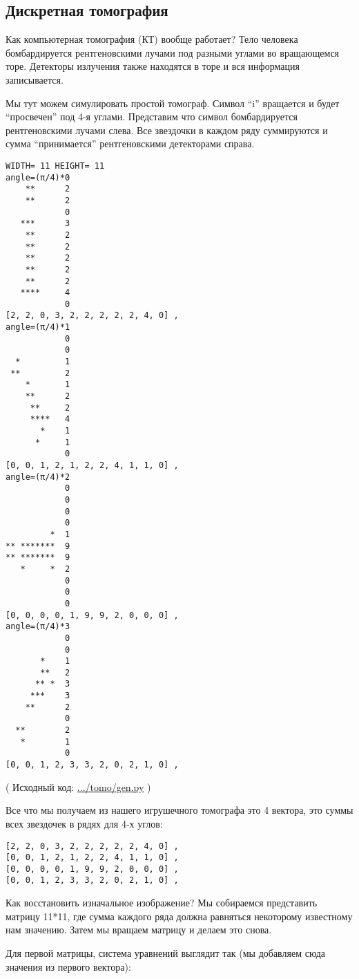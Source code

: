 \subsection{Дискретная томография}

Как компьютерная томография (КТ) вообще работает?
Тело человека бомбардируется рентгеновскими лучами под разными углами во вращающемся торе.
Детекторы излучения также находятся в торе и вся информация записывается.

Мы тут можем симулировать простой томограф.
Символ ``i'' вращается и будет ``просвечен'' под 4-я углами.
Представим что символ бомбардируется рентгеновскими лучами слева.
Все звездочки в каждом ряду суммируются и сумма ``принимается'' рентгеновскими детекторами справа.

\begin{lstlisting}
WIDTH= 11 HEIGHT= 11
angle=(π/4)*0
    **      2
    **      2
            0
   ***      3
    **      2
    **      2
    **      2
    **      2
    **      2
   ****     4
            0
[2, 2, 0, 3, 2, 2, 2, 2, 2, 4, 0] ,
angle=(π/4)*1
            0
            0
  *         1
 **         2
    *       1
    **      2
     **     2
     ****   4
       *    1
      *     1
            0
[0, 0, 1, 2, 1, 2, 2, 4, 1, 1, 0] ,
angle=(π/4)*2
            0
            0
            0
            0
         *  1
** *******  9
** *******  9
   *     *  2
            0
            0
            0
[0, 0, 0, 0, 1, 9, 9, 2, 0, 0, 0] ,
angle=(π/4)*3
            0
            0
       *    1
       **   2
      ** *  3
     ***    3
    **      2
            0
  **        2
   *        1
            0
[0, 0, 1, 2, 3, 3, 2, 0, 2, 1, 0] ,
\end{lstlisting}

( Исходный код: \url{.../tomo/gen.py} )

Все что мы получаем из нашего игрушечного томографа это 4 вектора, это суммы всех звездочек в рядях для 4-х углов:

\begin{lstlisting}
[2, 2, 0, 3, 2, 2, 2, 2, 2, 4, 0] ,
[0, 0, 1, 2, 1, 2, 2, 4, 1, 1, 0] ,
[0, 0, 0, 0, 1, 9, 9, 2, 0, 0, 0] ,
[0, 0, 1, 2, 3, 3, 2, 0, 2, 1, 0] ,
\end{lstlisting}

Как восстановить изначальное изображение?
Мы собираемся представить матрицу 11*11, где сумма каждого ряда должна равняться некоторому известному нам значению.
Затем мы вращаем матрицу и делаем это снова.

Для первой матрицы, система уравнений выглядит так (мы добавляем сюда значения из первого вектора):

